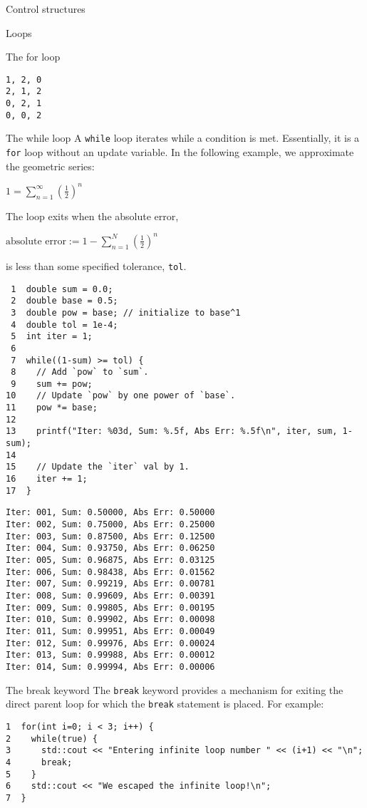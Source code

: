 \documentclass[presentation]{beamer}
\begin{document}
\begin{frame}[fragile,label={sec:orgheadline4}]{Control structures}
\begin{block}{Loops}
\begin{block}{The for loop}
\begin{verbatim}
1, 2, 0
2, 1, 2
0, 2, 1
0, 0, 2
\end{verbatim}
\end{block}

\begin{block}{The while loop}
A \texttt{while} loop iterates while a condition is met. Essentially, it is a \texttt{for}
loop without an update variable. In the following example, we approximate 
the geometric series:

\(1 = \sum_{n=1}^{\infty} \left(\frac{1}{2}\right)^n\)

The loop exits when the absolute error, 

\(\text{absolute error} := 1-\sum_{n=1}^N  \left(\frac{1}{2}\right)^n\)

is less than some specified tolerance, \texttt{tol}.

\begin{verbatim}
 1  double sum = 0.0;
 2  double base = 0.5;
 3  double pow = base; // initialize to base^1
 4  double tol = 1e-4;
 5  int iter = 1;
 6  
 7  while((1-sum) >= tol) {
 8    // Add `pow` to `sum`.
 9    sum += pow;
10    // Update `pow` by one power of `base`.
11    pow *= base;
12  
13    printf("Iter: %03d, Sum: %.5f, Abs Err: %.5f\n", iter, sum, 1-sum); 
14  
15    // Update the `iter` val by 1.
16    iter += 1;
17  }
\end{verbatim}

\begin{verbatim}
Iter: 001, Sum: 0.50000, Abs Err: 0.50000
Iter: 002, Sum: 0.75000, Abs Err: 0.25000
Iter: 003, Sum: 0.87500, Abs Err: 0.12500
Iter: 004, Sum: 0.93750, Abs Err: 0.06250
Iter: 005, Sum: 0.96875, Abs Err: 0.03125
Iter: 006, Sum: 0.98438, Abs Err: 0.01562
Iter: 007, Sum: 0.99219, Abs Err: 0.00781
Iter: 008, Sum: 0.99609, Abs Err: 0.00391
Iter: 009, Sum: 0.99805, Abs Err: 0.00195
Iter: 010, Sum: 0.99902, Abs Err: 0.00098
Iter: 011, Sum: 0.99951, Abs Err: 0.00049
Iter: 012, Sum: 0.99976, Abs Err: 0.00024
Iter: 013, Sum: 0.99988, Abs Err: 0.00012
Iter: 014, Sum: 0.99994, Abs Err: 0.00006
\end{verbatim}
\end{block}

\begin{block}{The break keyword}
The \texttt{break} keyword provides a mechanism for exiting the direct parent loop
for which the \texttt{break} statement is placed. For example:

\begin{verbatim}
1  for(int i=0; i < 3; i++) {
2    while(true) {
3      std::cout << "Entering infinite loop number " << (i+1) << "\n";
4      break;
5    }
6    std::cout << "We escaped the infinite loop!\n";
7  }
\end{verbatim}


\end{block}
\end{block}
\end{frame}
\end{document}
